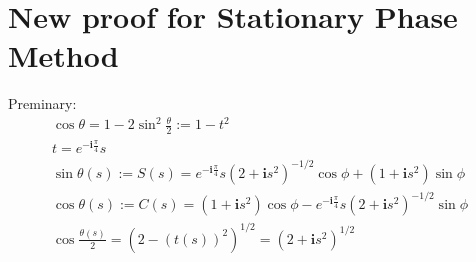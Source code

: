 \documentclass[12pt]{iopart}
\begin{document}
	\newcommand{\mL}{\mathscr{L}}
	\newcommand{\cT}{{\cal T}}
	\newcommand{\cM}{{\cal M}}
	\newcommand{\cE}{{\cal E}}
	\newcommand{\cL}{{\cal L}}
	\newcommand{\cF}{{\cal F}}
	\newcommand{\cB}{{\cal B}}
	\newcommand{\PML}{{\rm PML}}
	\newcommand{\FEM}{{\rm FEM}}
	\newcommand{\rd}{\,\mathrm{d}}
	
	\renewcommand{\i}{\mathbf{i}}
	\renewcommand{\v}{\mathbf{v}}
	\renewcommand{\u}{\mathbf{u}}
	\renewcommand{\r}{\mathbf{r}}
	\newcommand{\R}{{\mathbb{R}}}
	\newcommand{\Z}{{\mathbb{Z}}}
	\newcommand{\C}{{\mathbb{C}}}
	\renewcommand{\Re}{\mathrm{Re}\,}
	\renewcommand{\Im}{\mathrm{Im}\,}
	\renewcommand{\div}{\mathrm{div}}
	\newcommand{\curl}{\mathrm{curl}}
	\newcommand{\Curl}{\mathbf{curl}}
	
	
	\newcommand{\be}{\begin{eqnarray}}
	\newcommand{\ee}{\end{eqnarray}}
	\newcommand{\ben}{\begin{eqnarray*}}
		\newcommand{\een}{\end{eqnarray*}}
	\newcommand{\nn}{\nonumber}
	
	


\section{New proof for Stationary Phase Method}
Preminary:
\ben
\cos\theta=1-2\sin^2\frac{\theta}{2}:=1-t^2\\
t=e^{-\i\frac{\pi}{4}}s\\
\sin\theta(s):=S(s)=e^{-\i\frac{\pi}{4}}s(2+\i s^2)^{-1/2}\cos\phi+(1+\i s^2)\sin\phi \\
\cos\theta(s):=C(s)=(1+\i s^2)\cos\phi-e^{-\i\frac{\pi}{4}}s(2+\i s^2)^{-1/2}\sin\phi \\
\cos\frac{\theta(s)}{2}=(2-(t(s))^2)^{1/2}=(2+\i s^2)^{1/2}
\een
\end{document}
